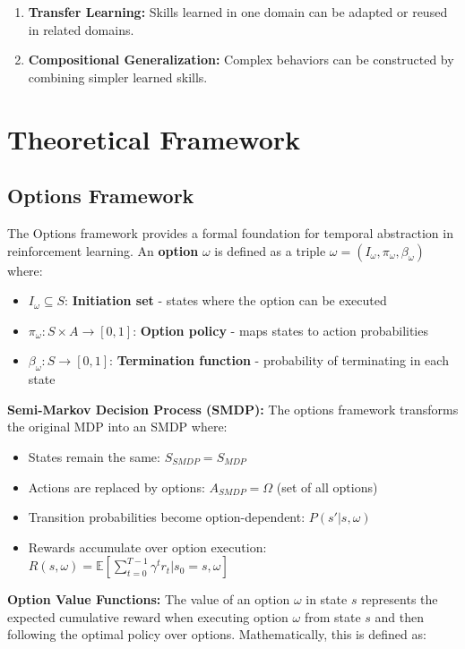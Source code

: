 \documentclass[12pt]{article}
\begin{document}
{{\begin{enumerate}
    \item \textbf{Transfer Learning:} Skills learned in one domain can be adapted or reused in related domains.
    
    \item \textbf{Compositional Generalization:} Complex behaviors can be constructed by combining simpler learned skills.
\end{enumerate}

\section{Theoretical Framework}

\subsection{Options Framework}

The Options framework provides a formal foundation for temporal abstraction in reinforcement learning. An \textbf{option} $\omega$ is defined as a triple $\omega = (I_\omega, \pi_\omega, \beta_\omega)$ where:

\begin{itemize}
    \item $I_\omega \subseteq S$: \textbf{Initiation set} - states where the option can be executed
    \item $\pi_\omega: S \times A \rightarrow [0,1]$: \textbf{Option policy} - maps states to action probabilities
    \item $\beta_\omega: S \rightarrow [0,1]$: \textbf{Termination function} - probability of terminating in each state
\end{itemize}

\textbf{Semi-Markov Decision Process (SMDP):}
The options framework transforms the original MDP into an SMDP where:
\begin{itemize}
    \item States remain the same: $S_{SMDP} = S_{MDP}$
    \item Actions are replaced by options: $A_{SMDP} = \Omega$ (set of all options)
    \item Transition probabilities become option-dependent: $P(s'|s,\omega)$
    \item Rewards accumulate over option execution: $R(s,\omega) = \mathbb{E}[\sum_{t=0}^{T-1} \gamma^t r_t | s_0 = s, \omega]$
\end{itemize}

\textbf{Option Value Functions:}
The value of an option $\omega$ in state $s$ represents the expected cumulative reward when executing option $\omega$ from state $s$ and then following the optimal policy over options. Mathematically, this is defined as:

}}
\end{document}
